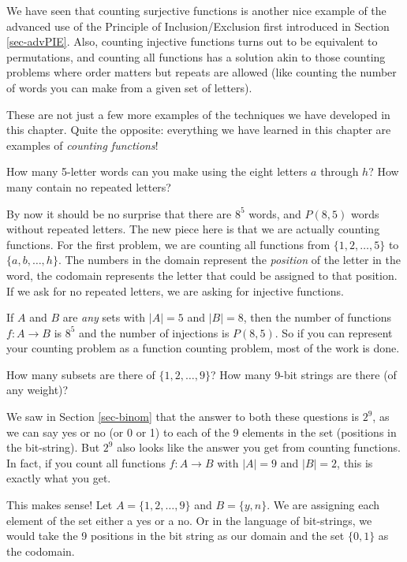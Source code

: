 \documentclass[12pt]{article}
\begin{document}
We have seen that counting surjective functions is another nice example of the advanced use of the Principle of Inclusion/Exclusion first introduced in Section \ref{sec-advPIE}.  Also, counting injective functions turns out to be equivalent to permutations, and counting all functions has a solution akin to those counting problems where order matters but repeats are allowed (like counting the number of words you can make from a given set of letters).  

These are not just a few more examples of the techniques we have developed in this chapter.  Quite the opposite: everything we have learned in this chapter are examples of \emph{counting functions}!

\begin{example}
How many 5-letter words can you make using the eight letters $a$ through $h$?  How many contain no repeated letters?

\begin{solution}
By now it should be no surprise that there are $8^5$ words, and $P(8,5)$ words without repeated letters.  The new piece here is that we are actually counting functions.  For the first problem, we are counting all functions from $\{1,2,\ldots, 5\}$ to $\{a,b,\ldots, h\}$.  The numbers in the domain represent the \emph{position} of the letter in the word, the codomain represents the letter that could be assigned to that position.  If we ask for no repeated letters, we are asking for injective functions.

If $A$ and $B$ are \emph{any} sets with $|A| = 5$ and $|B| = 8$, then the number of functions $f: A \to B$ is $8^5$ and the number of injections is $P(8,5)$.  So if you can represent your counting problem as a function counting problem, most of the work is done.
\end{solution}
\end{example} 


\begin{example}
How many subsets are there of $\{1,2,\ldots, 9\}$?  How many 9-bit strings are there (of any weight)?

\begin{solution}
We saw in Section \ref{sec-binom} that the answer to both these questions is $2^9$, as we can say yes or no (or 0 or 1) to each of the 9 elements in the set (positions in the bit-string).  But $2^9$ also looks like the answer you get from counting functions.  In fact, if you count all functions $f: A \to B$ with $|A| = 9$ and $|B| = 2$, this is exactly what you get.  

This makes sense!  Let $A = \{1,2,\ldots, 9\}$ and $B = \{y, n\}$.  We are assigning each element of the set either a yes or a no.  Or in the language of bit-strings, we would take the 9 positions in the bit string as our domain and the set $\{0,1\}$ as the codomain.
\end{solution}
\end{example}
 
\end{document}
